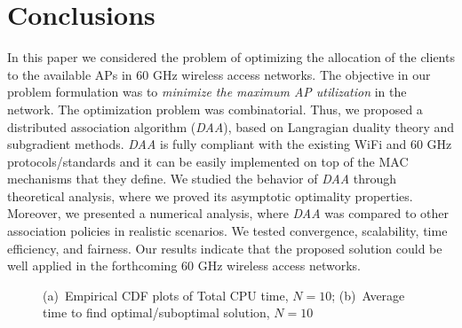 \documentclass[journal, 10pt, twocolumn]{IEEEtran}
\begin{document}
\section{Conclusions}\label{sec:conclusions}
In this paper we considered the problem of optimizing the allocation of the clients to the available APs in 60 GHz wireless access networks. The objective in our problem formulation was to \emph{minimize the maximum AP utilization} in the network. The optimization problem was combinatorial. Thus, we proposed a distributed association algorithm (\emph{DAA}), based on Langragian duality theory and subgradient methods. \emph{DAA} is fully compliant with the existing WiFi and 60 GHz protocols/standards and it can be easily implemented on top of the MAC mechanisms that they define. We studied the behavior of \emph{DAA} through theoretical analysis, where we proved its asymptotic optimality properties. Moreover, we presented a numerical analysis, where \emph{DAA} was compared to other association policies in realistic scenarios. We tested convergence, scalability, time efficiency, and fairness. Our results indicate that the proposed solution could be well applied in the forthcoming 60 GHz wireless access networks. 



\begin{figure}[t]
\centering
{}
\goodgap
{}\vspace{-2mm}
\caption{(a)~Empirical CDF plots of Total CPU time, $N=10$; (b)~Average time to find optimal/suboptimal solution, $N=10$}
\label{fig:Bound_illustration_all8}
\vspace{-0.4cm}
\end{figure}
\end{document}
